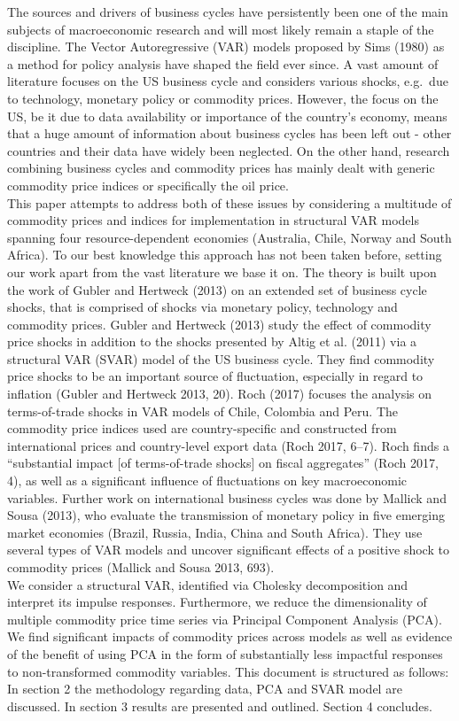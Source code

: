 \documentclass[12pt,]{article}
\begin{document}
The sources and drivers of business cycles have persistently been one of
the main subjects of macroeconomic research and will most likely remain
a staple of the discipline. The Vector Autoregressive (VAR) models
proposed by Sims (1980) as a method for policy analysis have shaped the
field ever since. A vast amount of literature focuses on the US business
cycle and considers various shocks, e.g.~due to technology, monetary
policy or commodity prices. However, the focus on the US, be it due to
data availability or importance of the country's economy, means that a
huge amount of information about business cycles has been left out -
other countries and their data have widely been neglected. On the other
hand, research combining business cycles and commodity prices has mainly
dealt with generic commodity price indices or specifically the oil
price.\\
This paper attempts to address both of these issues by considering a
multitude of commodity prices and indices for implementation in
structural VAR models spanning four resource-dependent economies
(Australia, Chile, Norway and South Africa). To our best knowledge this
approach has not been taken before, setting our work apart from the vast
literature we base it on. The theory is built upon the work of Gubler
and Hertweck (2013) on an extended set of business cycle shocks, that is
comprised of shocks via monetary policy, technology and commodity
prices. Gubler and Hertweck (2013) study the effect of commodity price
shocks in addition to the shocks presented by Altig et al. (2011) via a
structural VAR (SVAR) model of the US business cycle. They find
commodity price shocks to be an important source of fluctuation,
especially in regard to inflation (Gubler and Hertweck 2013, 20). Roch
(2017) focuses the analysis on terms-of-trade shocks in VAR models of
Chile, Colombia and Peru. The commodity price indices used are
country-specific and constructed from international prices and
country-level export data (Roch 2017, 6--7). Roch finds a ``substantial
impact {[}of terms-of-trade shocks{]} on fiscal aggregates'' (Roch 2017,
4), as well as a significant influence of fluctuations on key
macroeconomic variables. Further work on international business cycles
was done by Mallick and Sousa (2013), who evaluate the transmission of
monetary policy in five emerging market economies (Brazil, Russia,
India, China and South Africa). They use several types of VAR models and
uncover significant effects of a positive shock to commodity prices
(Mallick and Sousa 2013, 693).\\
We consider a structural VAR, identified via Cholesky decomposition and
interpret its impulse responses. Furthermore, we reduce the
dimensionality of multiple commodity price time series via Principal
Component Analysis (PCA). We find significant impacts of commodity
prices across models as well as evidence of the benefit of using PCA in
the form of substantially less impactful responses to non-transformed
commodity variables. This document is structured as follows: In section
2 the methodology regarding data, PCA and SVAR model are discussed. In
section 3 results are presented and outlined. Section 4 concludes.
\end{document}
